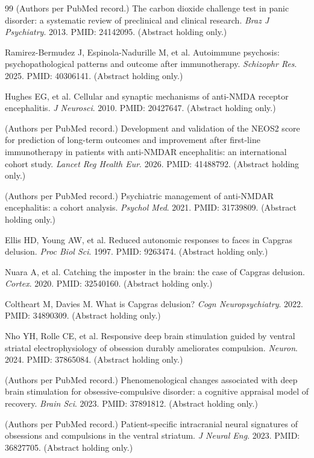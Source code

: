 \documentclass[9pt,twocolumn]{article}
\begin{document}
\begin{thebibliography}{99}
(Authors per PubMed record.) The carbon dioxide challenge test in panic disorder: a systematic review of preclinical and clinical research. \emph{Braz J Psychiatry}. 2013. PMID: 24142095. (Abstract holding only.)

Ramirez-Bermudez J, Espinola-Nadurille M, et al. Autoimmune psychosis: psychopathological patterns and outcome after immunotherapy. \emph{Schizophr Res}. 2025. PMID: 40306141. (Abstract holding only.)

Hughes EG, et al. Cellular and synaptic mechanisms of anti-NMDA receptor encephalitis. \emph{J Neurosci}. 2010. PMID: 20427647. (Abstract holding only.)

(Authors per PubMed record.) Development and validation of the NEOS2 score for prediction of long-term outcomes and improvement after first-line immunotherapy in patients with anti-NMDAR encephalitis: an international cohort study. \emph{Lancet Reg Health Eur}. 2026. PMID: 41488792. (Abstract holding only.)

(Authors per PubMed record.) Psychiatric management of anti-NMDAR encephalitis: a cohort analysis. \emph{Psychol Med}. 2021. PMID: 31739809. (Abstract holding only.)

Ellis HD, Young AW, et al. Reduced autonomic responses to faces in Capgras delusion. \emph{Proc Biol Sci}. 1997. PMID: 9263474. (Abstract holding only.)

Nuara A, et al. Catching the imposter in the brain: the case of Capgras delusion. \emph{Cortex}. 2020. PMID: 32540160. (Abstract holding only.)

Coltheart M, Davies M. What is Capgras delusion? \emph{Cogn Neuropsychiatry}. 2022. PMID: 34890309. (Abstract holding only.)

Nho YH, Rolle CE, et al. Responsive deep brain stimulation guided by ventral striatal electrophysiology of obsession durably ameliorates compulsion. \emph{Neuron}. 2024. PMID: 37865084. (Abstract holding only.)

(Authors per PubMed record.) Phenomenological changes associated with deep brain stimulation for obsessive-compulsive disorder: a cognitive appraisal model of recovery. \emph{Brain Sci}. 2023. PMID: 37891812. (Abstract holding only.)

(Authors per PubMed record.) Patient-specific intracranial neural signatures of obsessions and compulsions in the ventral striatum. \emph{J Neural Eng}. 2023. PMID: 36827705. (Abstract holding only.)


\end{thebibliography}
\end{document}
